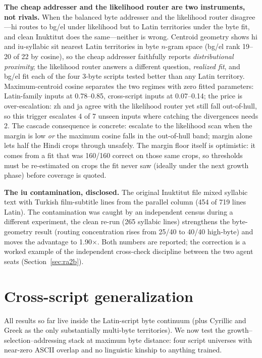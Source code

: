 \documentclass[11pt]{article}
\theoremstyle{definition}\newtheorem{definition}{Definition}
\theoremstyle{remark}\newtheorem{remark}{Remark}
\begin{document}
\textbf{The cheap addresser and the likelihood router are two instruments, not rivals.}
When the balanced byte addresser and the likelihood router disagree---hi routes to bg/el
under likelihood but to Latin territories under the byte fit, and clean Inuktitut does the
same---neither is wrong. Centroid geometry shows hi and iu-syllabic sit nearest Latin
territories in byte $n$-gram space (bg/el rank 19--20 of 22 by cosine), so the cheap
addresser faithfully reports \emph{distributional proximity}; the likelihood router answers
a different question, \emph{realized fit}, and bg/el fit each of the four 3-byte scripts tested better than any
Latin territory. Maximum-centroid cosine separates the two regimes with zero fitted
parameters: Latin-family inputs at 0.78--0.85, cross-script inputs at 0.07--0.14; the price is over-escalation: zh and ja agree with the likelihood router yet still fall out-of-hull, so this trigger escalates 4 of 7 unseen inputs where catching the divergences needs 2. The
cascade consequence is concrete: escalate to the likelihood scan when the margin is low
\emph{or} the maximum cosine falls in the out-of-hull band; margin alone lets half the
Hindi crops through unsafely. The margin floor itself is optimistic: it comes from a fit that was 160/160 correct on those same crops, so thresholds must be re-estimated on crops the fit never saw (ideally under the next growth phase) before coverage is quoted.

\textbf{The iu contamination, disclosed.} The original Inuktitut file mixed syllabic text
with Turkish film-subtitle lines from the parallel column (454 of 719 lines Latin). The
contamination was caught by an independent census during a different experiment, the
clean re-run (265 syllabic lines) strengthens the byte-geometry result (routing
concentration rises from 25/40 to 40/40 high-byte) and moves the advantage to
1.90$\times$. Both numbers are reported; the correction is a worked example of the
independent cross-check discipline between the two agent seats
(Section~\ref{sec:ra2b}).

\section{Cross-script generalization}
\label{sec:xscript}

All results so far live inside the Latin-script byte continuum (plus Cyrillic and Greek
as the only substantially multi-byte territories). We now test the growth--selection--addressing stack at
maximum byte distance: four script universes with near-zero ASCII overlap and no
linguistic kinship to anything trained.
\end{document}
